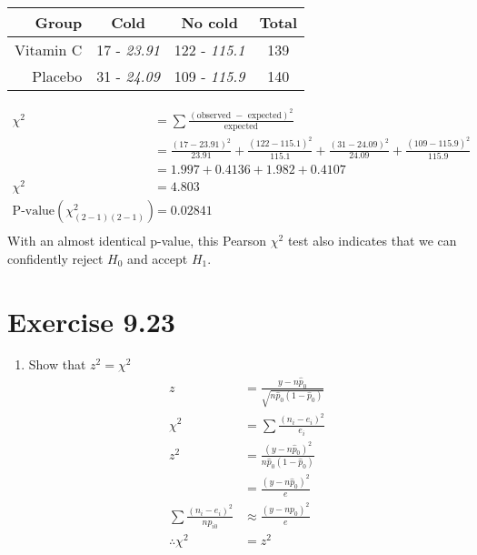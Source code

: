 \documentclass{article}
\begin{document}
\begin{enumerate}[\quad(a)]
\begin{center}
		\begin{tabular}{|r|c|c|c|}
			\hline
			Group & Cold & No cold & Total\\
			\hline
			Vitamin C & 17 - \emph{23.91} & 122 - \emph{115.1} & 139 \\
			\hline
			Placebo & 31 - \emph{24.09} & 109 - \emph{115.9} & 140 \\
			\hline
		\end{tabular}
	\end{center}
	\begin{align*}
		\chi^2 &= \sum \frac{(\text{observed } - \text{ expected})^2}{\text{expected}}\\
		&= \frac{(17 - 23.91)^2}{23.91} + \frac{(122 - 115.1)^2}{115.1} + \frac{(31 - 24.09)^2}{24.09} + \frac{(109 - 115.9)^2}{115.9}\\
		&= 1.997 + 0.4136 + 1.982 + 0.4107\\
		\chi^2 &= 4.803\\
		\text{P-value}(\chi^2_{(2-1)(2-1)}) &= 0.02841\\
	\end{align*}
	With an almost identical p-value, this Pearson $\chi^2$ test also indicates that we can confidently reject $H_0$ and accept $H_1$.
\end{enumerate}

\section*{Exercise 9.23}

\begin{enumerate}[\quad(a)]
	\item Show that $z^2 = \chi^2$
	\begin{align*}
		z &= \frac{y - n\hat{p}_0}{\sqrt{n\hat{p}_0(1-\hat{p}_0)}}\\
		\chi^2 &= \sum \frac{(n_i - e_i)^2}{e_i}\\
		z^2 &= \frac{(y - n\hat{p}_0)^2}{n\hat{p}_0(1-\hat{p}_0)}\\
		&= \frac{(y - n\hat{p}_0)^2}{e}\\
		\sum \frac{(n_i - e_i)^2}{np_{i0}} &\approx \frac{(y - np_0)^2}{e}\\
		\therefore \chi^2 &= z^2\\
	\end{align*}
\end{enumerate}
\end{document}
